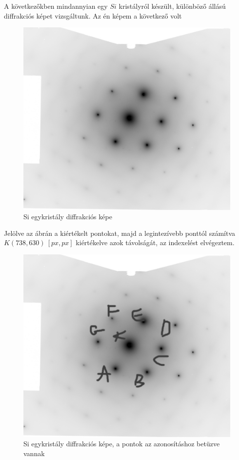\documentclass[a4paper,12pt]{article}
\begin{document}
\vspace{5mm}

\par A következőkben mindannyian egy $Si$ kristályról készült, különböző állású diffrakciós képet vizsgáltunk. Az én képem a következő volt

\vspace{5mm}

\begin{figure}[!htb]
\centering
\includegraphics[width=0.45\linewidth]{./Si_Olar.jpg}
\caption{ Si egykristály diffrakciós képe }
\end{figure}

\vspace{5mm}

\par Jelölve az ábrán a kiértékelt pontokat, majd a legintezívebb ponttól számítva $K(738, 630) ~[px, px]$ kiértékelve azok távolságát, az indexelést elvégeztem.

\vspace{5mm}

\begin{figure}[!htb]
\centering
\includegraphics[width=0.55\linewidth]{./Si_Olar_betuzott.jpg}
\caption{ Si egykristály diffrakciós képe, a pontok az azonosításhoz betüzve vannak }
\end{figure}

\vspace{5mm}
\end{document}
